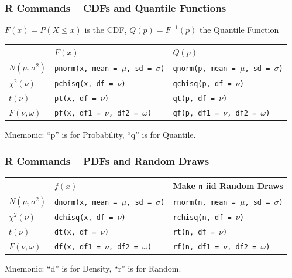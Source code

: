 \documentclass[handout]{beamer}
\begin{document}

\begin{frame}
\frametitle{R Commands -- CDFs and Quantile Functions}
$F(x) = P(X\leq x)$ is the CDF, $Q(p) = F^{-1}(p)$ the Quantile Function
\footnotesize
\begin{table}
\begin{tabular}{l|ll}
&$F(x)$&$Q(p)$\\
\hline
$N(\mu,\sigma^2)$ &\texttt{pnorm(x, mean = $\mu$,  sd = $\sigma$)}&\texttt{qnorm(p, mean = $\mu$,  sd = $\sigma$)}\\
$\chi^2(\nu)$&\texttt{pchisq(x, df = $\nu$)}&\texttt{qchisq(p, df = $\nu$)}\\
$t(\nu)$&\texttt{pt(x, df = $\nu$)}&\texttt{qt(p, df = $\nu$)}\\
$F(\nu,\omega)$&\texttt{pf(x, df1 = $\nu$, df2 = $\omega$)}&\texttt{qf(p, df1 = $\nu$, df2 = $\omega$)}
\end{tabular}
\end{table}
\vspace{1em}
\normalsize
\alert{Mnemonic: ``p'' is for Probability, ``q'' is for Quantile.}

\end{frame}
\begin{frame}
\frametitle{R Commands -- PDFs and Random Draws}
\footnotesize
\begin{table}
\begin{tabular}{l|ll}
&$f(x)$&Make \texttt{n} iid Random Draws\\
\hline
$N(\mu,\sigma^2)$ &\texttt{dnorm(x, mean = $\mu$,  sd = $\sigma$)}&\texttt{rnorm(n, mean = $\mu$,  sd = $\sigma$)}\\
$\chi^2(\nu)$&\texttt{dchisq(x, df = $\nu$)}&\texttt{rchisq(n, df = $\nu$)}\\
$t(\nu)$&\texttt{dt(x, df = $\nu$)}&\texttt{rt(n, df = $\nu$)}\\
$F(\nu,\omega)$&\texttt{df(x, df1 = $\nu$, df2 = $\omega$)}&\texttt{rf(n, df1 = $\nu$, df2 = $\omega$)}
\end{tabular}
\end{table}
\vspace{1em}
\normalsize
\alert{Mnemonic: ``d'' is for Density, ``r'' is for Random.}

\end{frame}
\end{document}
